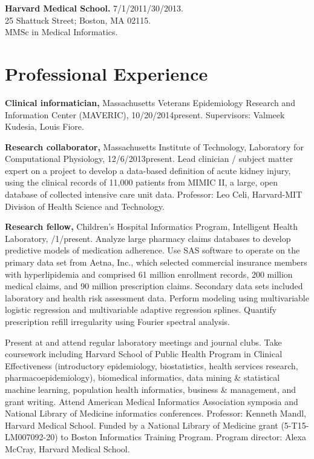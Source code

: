 \documentclass[12pt]{article}
\begin{document}
\textbf{Harvard Medical School.} 7/1/2011/30/2013.\\
25 Shattuck Street; Boston, MA 02115.\\
MMSc in Medical Informatics.

\newpage

\section*{Professional Experience} %

\textbf{Clinical informatician,} Massachusetts Veterans Epidemiology
Research and Information Center (MAVERIC), 10/20/2014\ndash{}present.
Supervisors: Valmeek Kudesia, Louis Fiore.

\textbf{Research collaborator,} Massachusetts Institute of Technology,
Laboratory for Computational Physiology, 12/6/2013\ndash{}present.
Lead clinician / subject matter expert on a project to develop a
data-based definition of acute kidney injury, using the clinical
records of 11,000 patients from MIMIC II, a large, open database of
collected intensive care unit data. Professor: Leo Celi, Harvard-MIT
Division of Health Science and Technology.

\textbf{Research fellow,} Children’s Hospital Informatics Program,
Intelligent Health Lab\-o\-ra\-to\-ry,
/1/\ndash{}\linebreak[0]pres\-ent.
Analyze large pharmacy claims databases to develop predictive models
of medication adherence. Use SAS software to operate on the primary
data set from Aetna, Inc., which selected commercial insurance members
with hyperlipidemia and comprised 61 million enrollment records, 200
million medical claims, and 90 million prescription claims. Secondary
data sets included laboratory and health risk assessment data. Perform
modeling using multivariable logistic regression and multivariable
adaptive regression splines. Quantify prescription refill irregularity
using Fourier spectral analysis.

Present at and attend regular laboratory meetings and journal clubs.
Take coursework including Harvard School of Public Health Program in
Clinical Effectiveness (introductory epidemiology, biostatistics,
health services research, pharmacoepidemiology), biomedical
informatics, data mining \& statistical machine learning, population
health informatics, business \& management, and grant writing. Attend
American Medical Informatics Association symposia and National Library
of Medicine informatics conferences. Professor: Kenneth Mandl, Harvard
Medical School. Funded by a National Library of Medicine grant
(5-T15-LM007092-20) to Boston Informatics Training Program. Program
director: Alexa McCray, Harvard Medical School.
\end{document}
